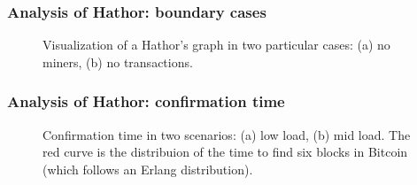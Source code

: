 \documentclass{beamer}
\begin{document}
\begin{frame}
\frametitle{Analysis of Hathor: boundary cases}

\begin{figure}
\centering
{}
\caption{Visualization of a Hathor's graph in two particular cases: (a) no miners, (b) no transactions.}
\end{figure}

\end{frame}


\begin{frame}
\frametitle{Analysis of Hathor: confirmation time}
\begin{figure}
\centering
{}

\caption{Confirmation time in two scenarios: (a) low load, (b) mid load. The red curve is the distribuion of the time to find six blocks in Bitcoin (which follows an Erlang distribution).}
\end{figure}
\end{frame}
\end{document}
